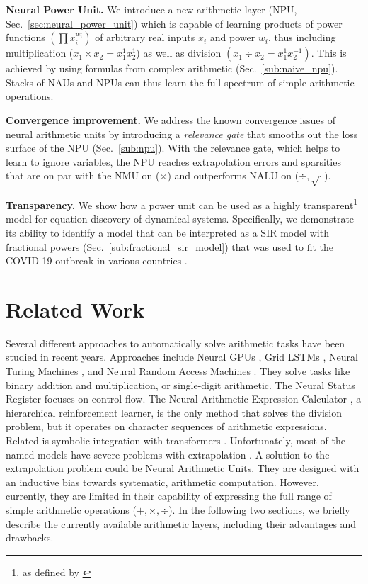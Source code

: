 \documentclass[9pt]{article}
\begin{document}
\textbf{Neural Power Unit.}
We introduce a new arithmetic layer (NPU, Sec.~\ref{sec:neural_power_unit})
which is capable of learning products of power functions $(\prod x_{i}^{w_i})$ of
arbitrary real inputs $x_i$ and power $w_i$, thus including multiplication
($x_1\times x_2 = x_1^1 x_2^1$) as well as division $(x_1\div
x_2=x_1^{1}x_2^{-1})$. This is achieved by using formulas from complex
arithmetic (Sec.~\ref{sub:naive_npu}).  Stacks of NAUs and NPUs can thus learn
the full spectrum of simple arithmetic operations.

\textbf{Convergence improvement.}
We address the known convergence issues of neural arithmetic units by
introducing a \emph{relevance gate} that smooths out the loss surface of the
NPU (Sec.~\ref{sub:npu}). With the relevance gate, which helps to learn to
ignore variables, the NPU reaches extrapolation errors and sparsities that are on
par with the NMU on ($\times$) and outperforms NALU on ($\div,\sqrt{\cdot}$).

\textbf{Transparency.}
We show how a power unit can be used as a highly transparent\footnote{as defined by
\cite{lipton_mythos_2017}} model for equation discovery
of dynamical systems. Specifically, we demonstrate its ability to identify
a model that can be interpreted as a SIR model with fractional powers
(Sec.~\ref{sub:fractional_sir_model}) that was used to fit the COVID-19
outbreak in various countries \citep{taghvaei_fractional_2020}.

\section{Related Work}%
\label{sec:related_work}

Several different approaches to automatically solve arithmetic tasks have
been studied in recent years. Approaches include Neural GPUs
\citep{kaiser_neural_2016}, Grid LSTMs \citep{kalchbrenner_grid_2016}, Neural
Turing Machines \citep{graves_neural_2014}, and Neural Random Access Machines
\citep{kurach_neural_2016}. They solve tasks like binary addition and
multiplication, or single-digit arithmetic. The Neural Status Register
\citep{faber_neural_2020} focuses on control flow.  The Neural Arithmetic
Expression Calculator \citep{chen_neural_2018}, a hierarchical reinforcement
learner, is the only method that solves the division problem, but it operates on
character sequences of arithmetic expressions. Related is symbolic integration
with transformers \citep{lample_deep_2019}. Unfortunately, most of the named models
have severe problems with extrapolation \citep{madsen_measuring_2019,saxton_analysing_2019}.
A solution to the extrapolation problem could be Neural Arithmetic Units. They are
designed with an inductive bias towards systematic, arithmetic computation.
However, currently, they are limited in their capability of expressing the full
range of simple arithmetic operations ($+,\times,\div$).
In the following two sections, we briefly describe the currently available
arithmetic layers, including their advantages and drawbacks.
\end{document}
